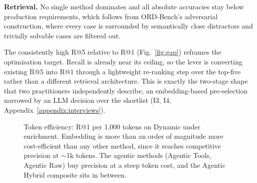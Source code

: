 \documentclass[10pt,twocolumn]{article}
\begin{document}
\textbf{Retrieval.} No single method dominates and all absolute accuracies stay below production requirements, which follows from ORD-Bench's adversarial construction, where every case is surrounded by semantically close distractors and trivially solvable cases are filtered out. %

The consistently high R@5 relative to R@1 (Fig.~\ref{fig:gap}) reframes the optimisation target. Recall is already near its ceiling, so the lever is converting existing R@5 into R@1 through a lightweight re-ranking step over the top-five rather than a different retrieval architecture. This is exactly the two-stage shape that two practitioners independently describe, an embedding-based pre-selection narrowed by an LLM decision over the shortlist (I3, I4, Appendix~\ref{appendix:interviews}). %


\begin{figure}[t]
  \centering
  \caption{Token efficiency: R@1 per 1{,}000 tokens on Dynamic under enrichment. Embedding is more than an order of magnitude more cost-efficient than any other method, since it reaches competitive precision at $\sim$1k tokens. The agentic methods (Agentic Tools, Agentic Raw) buy precision at a steep token cost, and the Agentic Hybrid composite sits in between.}
  \label{fig:token-eff}
\end{figure}
\end{document}
